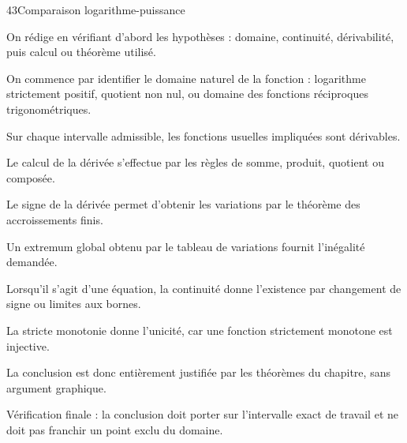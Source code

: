 \documentclass[11pt,a4paper]{article}
\begin{document}
\begin{corrbox}{43}{Comparaison logarithme-puissance}

\begin{methodebox}
On rédige en vérifiant d'abord les hypothèses : domaine, continuité, dérivabilité, puis calcul ou théorème utilisé.
\end{methodebox}

On commence par identifier le domaine naturel de la fonction : logarithme strictement positif, quotient non nul, ou domaine des fonctions réciproques trigonométriques.


Sur chaque intervalle admissible, les fonctions usuelles impliquées sont dérivables.


Le calcul de la dérivée s'effectue par les règles de somme, produit, quotient ou composée.


Le signe de la dérivée permet d'obtenir les variations par le théorème des accroissements finis.


Un extremum global obtenu par le tableau de variations fournit l'inégalité demandée.


Lorsqu'il s'agit d'une équation, la continuité donne l'existence par changement de signe ou limites aux bornes.


La stricte monotonie donne l'unicité, car une fonction strictement monotone est injective.


La conclusion est donc entièrement justifiée par les théorèmes du chapitre, sans argument graphique.


\begin{attentionbox}
Vérification finale : la conclusion doit porter sur l'intervalle exact de travail et ne doit pas franchir un point exclu du domaine.
\end{attentionbox}

\end{corrbox}
\end{document}
